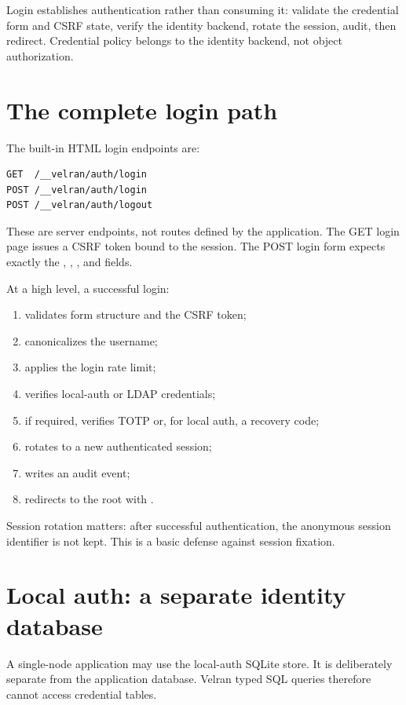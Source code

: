 Login establishes authentication rather than consuming it: validate the credential form and CSRF state, verify the identity backend, rotate the session, audit, then redirect. Credential policy belongs to the identity backend, not object authorization.

\section{The complete login path}

The built-in HTML login endpoints are:

\begin{lstlisting}
GET  /__velran/auth/login
POST /__velran/auth/login
POST /__velran/auth/logout
\end{lstlisting}

These are server endpoints, not routes defined by the application. The GET login page issues a CSRF token bound to the session. The POST login form expects exactly the , , , and  fields.

At a high level, a successful login:

\begin{enumerate}
  \item validates form structure and the CSRF token;
  \item canonicalizes the username;
  \item applies the login rate limit;
  \item verifies local-auth or LDAP credentials;
  \item if required, verifies TOTP or, for local auth, a recovery code;
  \item rotates to a new authenticated session;
  \item writes an audit event;
  \item redirects to the root with .
\end{enumerate}

Session rotation matters: after successful authentication, the anonymous session identifier is not kept. This is a basic defense against session fixation.

\section{Local auth: a separate identity database}

A single-node application may use the local-auth SQLite store. It is deliberately separate from the application database. Velran typed SQL queries therefore cannot access credential tables.

